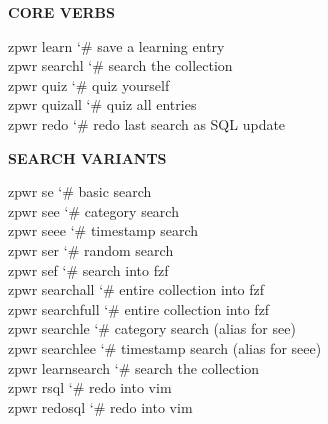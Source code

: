 \documentclass[11pt,a4paper,twoside]{book}
\begin{document}
\vspace{12pt}
{\bfseries\color{neonyellow} CORE VERBS}\vspace{4pt}

\begin{codebox}
\color{neongreen}zpwr learn                  {\char`\#} save a learning entry\\
\color{neongreen}zpwr searchl                {\char`\#} search the collection\\
\color{neongreen}zpwr quiz                   {\char`\#} quiz yourself\\
\color{neongreen}zpwr quizall                {\char`\#} quiz all entries\\
\color{neongreen}zpwr redo                   {\char`\#} redo last search as SQL update\\
\end{codebox}


\vspace{12pt}
{\bfseries\color{neonyellow} SEARCH VARIANTS}\vspace{4pt}

\begin{codebox}
\color{neongreen}zpwr se                     {\char`\#} basic search\\
\color{neongreen}zpwr see                    {\char`\#} category search\\
\color{neongreen}zpwr seee                   {\char`\#} timestamp search\\
\color{neongreen}zpwr ser                    {\char`\#} random search\\
\color{neongreen}zpwr sef                    {\char`\#} search into fzf\\
\color{neongreen}zpwr searchall              {\char`\#} entire collection into fzf\\
\color{neongreen}zpwr searchfull             {\char`\#} entire collection into fzf\\
\color{neongreen}zpwr searchle               {\char`\#} category search (alias for see)\\
\color{neongreen}zpwr searchlee              {\char`\#} timestamp search (alias for seee)\\
\color{neongreen}zpwr learnsearch            {\char`\#} search the collection\\
\color{neongreen}zpwr rsql                   {\char`\#} redo into vim\\
\color{neongreen}zpwr redosql                {\char`\#} redo into vim\\
\end{codebox}
\end{document}
